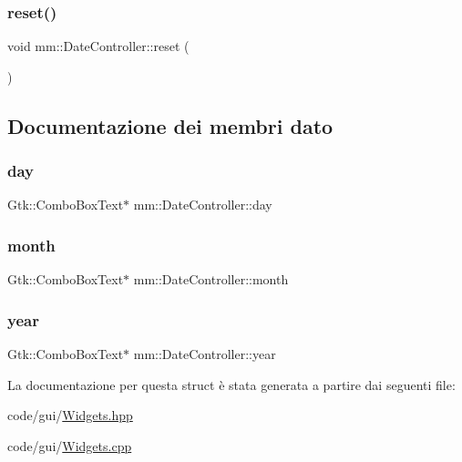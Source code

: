 \subsubsection{\texorpdfstring{reset()}{reset()}}
{\footnotesize\ttfamily void mm\+::\+Date\+Controller\+::reset (\begin{DoxyParamCaption}{ }\end{DoxyParamCaption})}



\subsection{Documentazione dei membri dato}
\mbox{\label{structmm_1_1_date_controller_a332df89b4a88fe3ace3d6d86934a575d}} 
\subsubsection{\texorpdfstring{day}{day}}
{\footnotesize\ttfamily Gtk\+::\+Combo\+Box\+Text$\ast$ mm\+::\+Date\+Controller\+::day}

\mbox{\label{structmm_1_1_date_controller_a1e7373cef0b00e63343ef9d30a1e80c5}} 
\subsubsection{\texorpdfstring{month}{month}}
{\footnotesize\ttfamily Gtk\+::\+Combo\+Box\+Text$\ast$ mm\+::\+Date\+Controller\+::month}

\mbox{\label{structmm_1_1_date_controller_a36179406cda47b8c18d1a84945a5e61c}} 
\subsubsection{\texorpdfstring{year}{year}}
{\footnotesize\ttfamily Gtk\+::\+Combo\+Box\+Text$\ast$ mm\+::\+Date\+Controller\+::year}



La documentazione per questa struct è stata generata a partire dai seguenti file\+:\begin{DoxyCompactItemize}
\item 
code/gui/\mbox{\hyperlink{_widgets_8hpp}{Widgets.\+hpp}}\item 
code/gui/\mbox{\hyperlink{_widgets_8cpp}{Widgets.\+cpp}}\end{DoxyCompactItemize}
